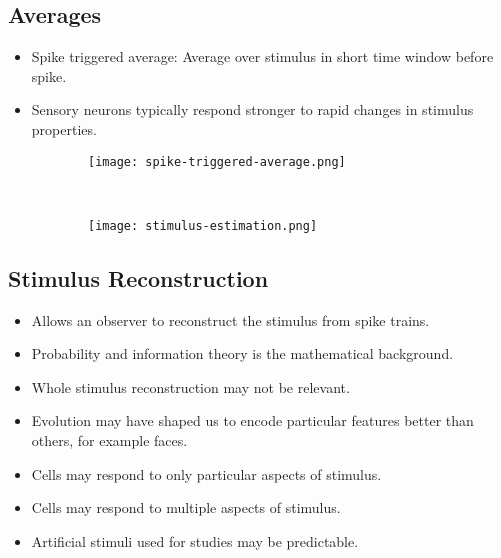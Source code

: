 \documentclass[main]{subfiles}
\begin{document}
\subsection{Averages}
\begin{itemize}[noitemsep,nolistsep]
	\item Spike triggered average: Average over stimulus in short time window before spike.
	\item Sensory neurons typically respond stronger to rapid changes in stimulus properties.
\end{itemize}
\begin{figure}[H]
	\centering
	\begin{subfigure}[b]{0.5\textwidth}
		\centering
		\texttt{[image: spike-triggered-average.png]}
	\end{subfigure}%
	~
	\begin{subfigure}[b]{0.5\textwidth}
		\centering
		\texttt{[image: stimulus-estimation.png]}
	\end{subfigure}
\end{figure}

\subsection{Stimulus Reconstruction}
\begin{itemize}[noitemsep,nolistsep]
	\item Allows an observer to reconstruct the stimulus from spike trains.
	\item Probability and information theory is the mathematical background.
	\item Whole stimulus reconstruction may not be relevant.
	\item Evolution may have shaped us to encode particular features better than others, for example faces.
	\item Cells may respond to only particular aspects of stimulus.
	\item Cells may respond to multiple aspects of stimulus.
	\item Artificial stimuli used for studies may be predictable.
\end{itemize}
\end{document}
